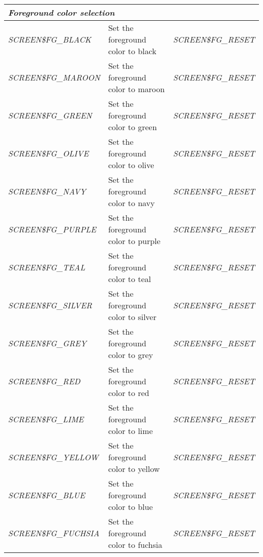 \documentclass[a4paper]{book}
\begin{document}
\begin{table}[h!tb]
\begin{minipage}[h!tb]{\textwidth}
\begin{tabular}{lp{60mm}l}
\hline\multicolumn{3}{l}{\textit{Foreground color selection}} \\ \hline
\scriptsize{\textsl{SCREEN{\$}FG{\_}BLACK}  }           & Set the foreground color to black   & \scriptsize{\textsl{SCREEN{\$}FG{\_}RESET}} \\
\scriptsize{\textsl{SCREEN{\$}FG{\_}MAROON} }           & Set the foreground color to maroon  & \scriptsize{\textsl{SCREEN{\$}FG{\_}RESET}} \\
\scriptsize{\textsl{SCREEN{\$}FG{\_}GREEN}  }           & Set the foreground color to green   & \scriptsize{\textsl{SCREEN{\$}FG{\_}RESET}} \\
\scriptsize{\textsl{SCREEN{\$}FG{\_}OLIVE}  }           & Set the foreground color to olive   & \scriptsize{\textsl{SCREEN{\$}FG{\_}RESET}} \\
\scriptsize{\textsl{SCREEN{\$}FG{\_}NAVY}   }           & Set the foreground color to navy    & \scriptsize{\textsl{SCREEN{\$}FG{\_}RESET}} \\
\scriptsize{\textsl{SCREEN{\$}FG{\_}PURPLE} }           & Set the foreground color to purple  & \scriptsize{\textsl{SCREEN{\$}FG{\_}RESET}} \\
\scriptsize{\textsl{SCREEN{\$}FG{\_}TEAL}   }           & Set the foreground color to teal    & \scriptsize{\textsl{SCREEN{\$}FG{\_}RESET}} \\
\scriptsize{\textsl{SCREEN{\$}FG{\_}SILVER} }           & Set the foreground color to silver  & \scriptsize{\textsl{SCREEN{\$}FG{\_}RESET}} \\
\scriptsize{\textsl{SCREEN{\$}FG{\_}GREY}   }           & Set the foreground color to grey    & \scriptsize{\textsl{SCREEN{\$}FG{\_}RESET}} \\
\scriptsize{\textsl{SCREEN{\$}FG{\_}RED}    }           & Set the foreground color to red	  & \scriptsize{\textsl{SCREEN{\$}FG{\_}RESET}} \\
\scriptsize{\textsl{SCREEN{\$}FG{\_}LIME}   }           & Set the foreground color to lime    & \scriptsize{\textsl{SCREEN{\$}FG{\_}RESET}} \\
\scriptsize{\textsl{SCREEN{\$}FG{\_}YELLOW} }           & Set the foreground color to yellow  & \scriptsize{\textsl{SCREEN{\$}FG{\_}RESET}} \\
\scriptsize{\textsl{SCREEN{\$}FG{\_}BLUE}   }           & Set the foreground color to blue    & \scriptsize{\textsl{SCREEN{\$}FG{\_}RESET}} \\
\scriptsize{\textsl{SCREEN{\$}FG{\_}FUCHSIA}}           & Set the foreground color to fuchsia & \scriptsize{\textsl{SCREEN{\$}FG{\_}RESET}} \\

\end{tabular}
\end{minipage}
\end{table}
\end{document}
